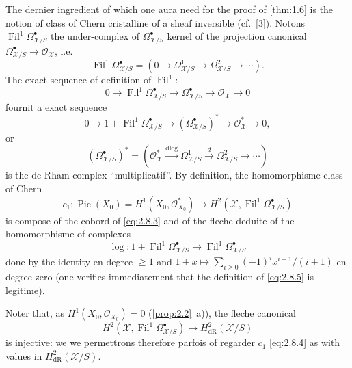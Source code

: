 \documentclass[12pt,a4paper]{article}
\theoremstyle{plain}
\theoremstyle{definition}
\theoremstyle{remark}
\DeclareMathOperator{\Pic}{Pic}
\DeclareMathOperator{\Fil}{Fil}
\newcommand{\dlog}{\mathrm{dlog}}
\begin{document}
The dernier ingredient of which one aura need for the proof of \ref{thm:1.6} is the notion of class of Chern cristalline of a sheaf inversible (cf.~[3]). Notons $\Fil^1 \Omega^{\bullet}_{\mathcal{X}/S}$ the under-complex of $\Omega^{\bullet}_{\mathcal{X}/S}$ kernel of the projection canonical $\Omega^{\bullet}_{\mathcal{X}/S} \to \mathcal{O}_{\mathcal{X}}$, i.e.
\[
\Fil^1 \Omega^{\bullet}_{\mathcal{X}/S} = (0 \to \Omega^1_{\mathcal{X}/S} \to \Omega^2_{\mathcal{X}/S} \to \cdots).
\]
The exact sequence of definition of $\Fil^1$:
\begin{equation}\label{eq:2.8.2}
0 \to \Fil^1 \Omega^{\bullet}_{\mathcal{X}/S} \to \Omega^{\bullet}_{\mathcal{X}/S} \to \mathcal{O}_{\mathcal{X}} \to 0
\end{equation}
fournit a exact sequence
\begin{equation}\label{eq:2.8.3}
0 \to 1 + \Fil^1 \Omega^{\bullet}_{\mathcal{X}/S} \to (\Omega^{\bullet}_{\mathcal{X}/S})^* \to \mathcal{O}_{\mathcal{X}}^* \to 0,
\end{equation}
or
\[
(\Omega^{\bullet}_{\mathcal{X}/S})^* = (\mathcal{O}_{\mathcal{X}}^* \xrightarrow{\dlog} \Omega^1_{\mathcal{X}/S} \xrightarrow{d} \Omega^2_{\mathcal{X}/S} \to \cdots)
\]
is the de Rham complex ``multiplicatif''. By definition, the homomorphisme class of Chern
\begin{equation}\label{eq:2.8.4}
c_1: \Pic(X_0) = H^1(X_0, \mathcal{O}_{X_0}^*) \to H^2(\mathcal{X}, \Fil^1 \Omega^{\bullet}_{\mathcal{X}/S})
\end{equation}
is compose of the cobord of \eqref{eq:2.8.3} and of the fleche deduite of the homomorphisme of complexes
\begin{equation}\label{eq:2.8.5}
\log: 1 + \Fil^1 \Omega^{\bullet}_{\mathcal{X}/S} \to \Fil^1 \Omega^{\bullet}_{\mathcal{X}/S}
\end{equation}
done by the identity en degree $\geqslant 1$ and $1+x \mapsto \sum_{i \geqslant 0} (-1)^i x^{i+1}/(i+1)$ en degree zero (one verifies immediatement that the definition of \eqref{eq:2.8.5} is legitime).

Noter that, as $H^1(X_0, \mathcal{O}_{X_0}) = 0$ (\ref{prop:2.2}~a)), the fleche canonical
\begin{equation}\label{eq:2.8.6}
H^2(\mathcal{X}, \Fil^1 \Omega^{\bullet}_{\mathcal{X}/S}) \to H^2_{\mathrm{dR}}(\mathcal{X}/S)
\end{equation}
is injective: we we permettrons therefore parfois of regarder $c_1$ \eqref{eq:2.8.4} as with values in $H^2_{\mathrm{dR}}(\mathcal{X}/S)$.
\end{document}
